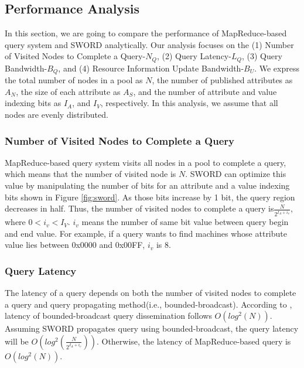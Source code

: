 \documentclass{acm_proc_article-sp}
\begin{document}
\subsection{Performance Analysis}
In this section, we are going to compare the performance of MapReduce-based query system and SWORD analytically. 
Our analysis focuses on the (1) Number of Visited Nodes to Complete a Query-$N_Q$, (2) Query Latency-$L_Q$, (3) Query Bandwidth-$B_Q$, and (4) Resource Information Update Bandwidth-$B_U$.
We express the total number of nodes in a pool as $N$, the number of published attributes as $A_N$, the size of each attribute as $A_S$, 
and the number of attribute and value indexing bits as $I_A$, and $I_V$, respectively. In this analysis, we assume that all nodes are evenly distributed.

\subsubsection{Number of Visited Nodes to Complete a Query}
MapReduce-based query system visits all nodes in a pool to complete a query, which means that the number of visited node is $N$.
SWORD can optimize this value by manipulating the number of bits for an attribute and a value indexing bits shown in Figure \ref{fig:sword}. As those bits increase by 1 bit, 
the query region decreases in half. Thus, the number of visited nodes to complete a query is\begin{math}\frac{N}{2^{I_A+i_v}}\end{math}, where \begin{math}0<i_v<I_V\end{math}.
\begin{math}i_v\end{math} means the number of same bit value between query begin and end value. For example, if a query wants to find machines whose attribute value lies between 0x0000 and 0x00FF, \begin{math}i_v\end{math} is 8. 
\subsubsection{Query Latency}
The latency of a query depends on both the number of visited nodes to complete a query and query propagating method(i.e., bounded-broadcast). 
According to \cite{deetoo}, latency of bounded-broadcast query dissemination follows \begin{math}O(log^2(N))\end{math}. Assuming SWORD propagates query using bounded-broadcast,
the query latency will be  \begin{math}O(log^2(\frac{N}{2^{I_A+i_v}}))\end{math}. Otherwise, the latency of MapReduce-based query is  \begin{math}O(log^2(N))\end{math}.
\end{document}
